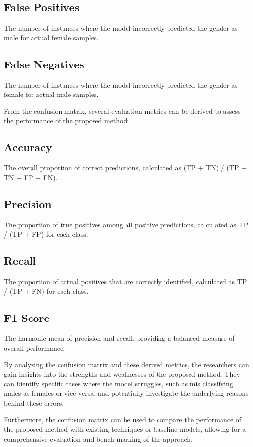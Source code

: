 \subsection{False Positives}
The number of instances where the model incorrectly predicted the gender as male for actual female samples.

\subsection{False Negatives}
The number of instances where the model incorrectly predicted the gender as female for actual male samples.

From the confusion matrix, several evaluation metrics can be derived to assess the performance of the proposed method:

\subsection{Accuracy}
The overall proportion of correct predictions, calculated as (TP + TN) / (TP + TN + FP + FN).

\subsection{Precision}
The proportion of true positives among all positive predictions, calculated as TP / (TP + FP) for each class.

\subsection{Recall}
The proportion of actual positives that are correctly identified, calculated as TP / (TP + FN) for each class.

\subsection{F1 Score}
The harmonic mean of precision and recall, providing a balanced measure of overall performance.

By analyzing the confusion matrix and these derived metrics, the researchers can gain insights into the strengths and weaknesses of the proposed method. They can identify specific cases where the model struggles, such as mis classifying males as females or vice versa, and potentially investigate the underlying reasons behind these errors.

Furthermore, the confusion matrix can be used to compare the performance of the proposed method with existing techniques or baseline models, allowing for a comprehensive evaluation and bench marking of the approach.

